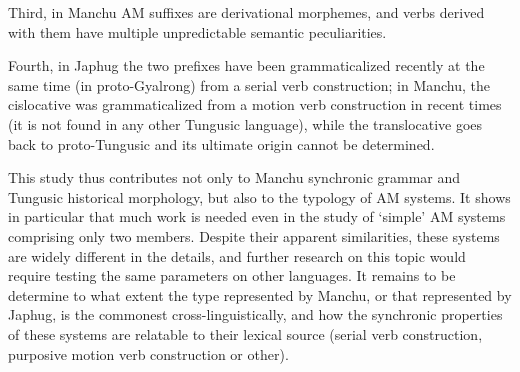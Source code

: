 \documentclass{article}
\begin{document}
Third, in Manchu AM suffixes are derivational morphemes, and   verbs derived with them have multiple unpredictable semantic peculiarities.

Fourth, in Japhug the two prefixes have been grammaticalized recently at the same time (in proto-Gyalrong) from a serial verb construction; in Manchu, the cislocative was grammaticalized from a motion verb construction in recent times (it is not found in any other Tungusic language), while the translocative goes back to proto-Tungusic and its ultimate origin cannot be determined.


This study thus contributes not only to Manchu synchronic grammar and Tungusic historical morphology, but also to the typology of AM systems. It shows in particular that much work is needed even in the study of `simple' AM systems comprising only two members. Despite their apparent similarities, these systems are widely different in the details, and further research on this topic would require testing the same parameters on other languages. It remains to be determine to what extent the type represented by Manchu, or that represented by Japhug, is the commonest cross-linguistically, and how the synchronic properties of these systems are relatable to their lexical source (serial verb construction, purposive motion verb construction or other).




 
\end{document}
